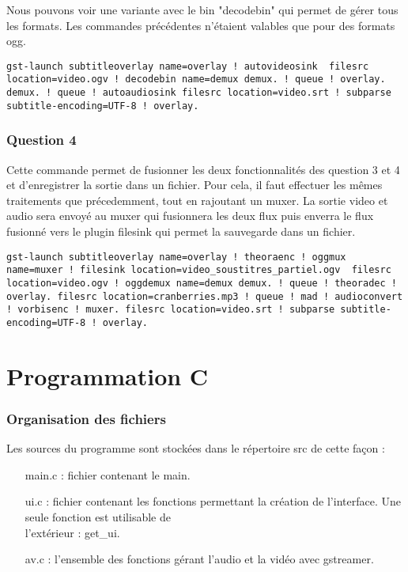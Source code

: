 \documentclass[10pt,a4paper]{article}
\begin{document}
Nous pouvons voir une variante avec le bin "decodebin" qui permet de gérer tous les formats. Les commandes précédentes n'étaient valables que pour des formats ogg.
\begin{lstlisting}
gst-launch subtitleoverlay name=overlay ! autovideosink  filesrc location=video.ogv ! decodebin name=demux demux. ! queue ! overlay. demux. ! queue ! autoaudiosink filesrc location=video.srt ! subparse subtitle-encoding=UTF-8 ! overlay.
\end{lstlisting}

\section*{Question 4}

Cette commande permet de fusionner les deux fonctionnalités des question 3 et 4 et d'enregistrer la sortie dans un fichier.
Pour cela, il faut effectuer les mêmes traitements que précedemment, tout en rajoutant un muxer. La sortie video et audio sera envoyé au muxer qui fusionnera les deux flux puis enverra le flux fusionné vers le plugin filesink qui permet la sauvegarde dans un fichier.
\begin{lstlisting}
gst-launch subtitleoverlay name=overlay ! theoraenc ! oggmux name=muxer ! filesink location=video_soustitres_partiel.ogv  filesrc location=video.ogv ! oggdemux name=demux demux. ! queue ! theoradec ! overlay. filesrc location=cranberries.mp3 ! queue ! mad ! audioconvert ! vorbisenc ! muxer. filesrc location=video.srt ! subparse subtitle-encoding=UTF-8 ! overlay.
\end{lstlisting}

\part*{Programmation C}

\section*{Organisation des fichiers}

Les sources du programme sont stockées dans le répertoire src de cette façon :
\begin{enumerate}
    \item [main.c] : fichier contenant le main.
    \item [ui.c] : fichier contenant les fonctions permettant la création de l'interface. Une seule fonction est utilisable de \\
        l'extérieur : get\_ui.
    \item [av.c] : l'ensemble des fonctions gérant l'audio et la vidéo avec gstreamer.
\end{enumerate}
\end{document}
